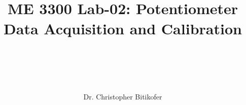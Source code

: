 
\title{
\begin{center}
\HRule \\[0.4cm]
{\Huge \bfseries ME 3300 Lab-02: 
Potentiometer Data Acquisition and Calibration \\[0.5cm] 
}\\[0.4cm] %
\HRule \\[1.5cm]
\end{center}
}
\author{\Large Dr. Christopher Bitikofer \\ \\ \\[.1cm]} %
\date{} %

\maketitle
\tableofcontents